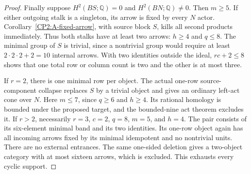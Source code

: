 \begin{proof}
Finally suppose $H^2(BS;\mathbb Q)=0$ and
$H^2(BN;\mathbb Q)\ne0$. Then $m\ge5$. If either outgoing
stalk is a singleton, its arrow is fixed by every $N$
actor. Corollary~\ref{CP2:A-fixed-arrow}, with source
block $S$, kills all second products immediately.
Thus both stalks have at least two arrows: $h\ge4$ and
$q\le8$. The minimal group of $S$ is trivial, since a
nontrivial group would require at least
$2\cdot2\cdot2+2=10$ internal arrows. With two identities
outside the ideal, $rc+2\le8$ shows that one total row
or column count is two and the other is at most three.

If $r=2$, there is one minimal row per object. The actual
one-row source-component collapse replaces $S$ by a trivial
object and gives an ordinary left-act cone over $N$.
Here $m\le7$, since $q\ge6$ and $h\ge4$. Its rational
homology is bounded under the proposed target, and the
bounded-nine act theorem excludes it. If $r>2$, necessarily
$r=3$, $c=2$, $q=8$, $m=5$, and $h=4$. The pair consists
of its six-element minimal band and its two identities.
Its one-row object again has all incoming arrows fixed
by its minimal idempotent and no nontrivial units. There
are no external entrances. The same one-sided deletion
gives a two-object category with at most sixteen arrows,
which is excluded. This exhausts every cyclic support.
\end{proof}
